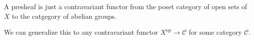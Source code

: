 A presheaf is just a contravariant functor from the poset category of open sets
of $X$ to the catgegory of abelian groups.

We can generalize this to any contravariant functor $X^{\text{op}}\to \mathcal{C}$ for
some category $\mathcal{C}$.
